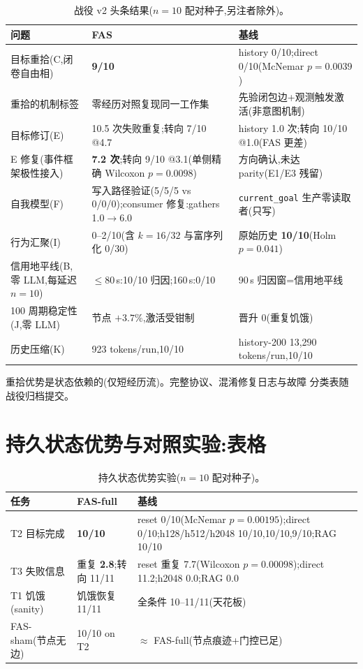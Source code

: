 \documentclass[10pt,a4paper]{ctexart}
\begin{document}
\begin{table}[h]
\centering\small
\caption{战役 v2 头条结果($n{=}10$ 配对种子,另注者除外)。}
\label{tab:s-campaign-zh}
\begin{tabular}{L{4.6cm}L{4.6cm}L{5.6cm}}
\toprule
\textbf{问题} & \textbf{FAS} & \textbf{基线} \\
\midrule
目标重拾(C,闭卷自由相) & \textbf{9/10} & history 0/10;direct 0/10(McNemar $p{=}0.0039$) \\
重拾的机制标签 & 零经历对照复现同一工作集 & 先验闭包边+观测触发激活(非意图机制) \\
目标修订(E) & 10.5 次失败重复;转向 7/10 @4.7 & history 1.0 次;转向 10/10 @1.0(FAS 更差) \\
E 修复(事件框架极性接入) & \textbf{7.2 次};转向 9/10 @3.1(单侧精确 Wilcoxon $p{=}0.0098$) & 方向确认,未达 parity(E1/E3 残留) \\
自我模型(F) & 写入路径验证(5/5/5 vs 0/0/0);consumer 修复:gathers 1.0$\rightarrow$6.0 & \texttt{current\_goal} 生产零读取者(只写) \\
行为汇聚(I) & 0--2/10(含 $k{=}16/32$ 与富序列化 0/30) & 原始历史 \textbf{10/10}(Holm $p{=}0.041$) \\
信用地平线(B,零 LLM,每延迟 $n{=}10$) & $\le$80\,s:10/10 归因;160\,s:0/10 & 90\,s 归因窗=信用地平线 \\
100 周期稳定性(J,零 LLM) & 节点 $+3.7\%$,激活受钳制 & 晋升 0(重复饥饿) \\
历史压缩(K) & 923 tokens/run,10/10 & history-200 13{,}290 tokens/run,10/10 \\
\bottomrule
\end{tabular}
\end{table}

重拾优势是状态依赖的(仅短经历流)。完整协议、混淆修复日志与故障
分类表随战役归档提交。


\section{持久状态优势与对照实验:表格}
\label{s16:psa}

\begin{table}[h]
\centering\small
\caption{持久状态优势实验($n{=}10$ 配对种子)。}
\label{tab:s-psa-zh}
\begin{tabular}{L{4.2cm}L{4.2cm}L{5.6cm}}
\toprule
\textbf{任务} & \textbf{FAS-full} & \textbf{基线} \\
\midrule
T2 目标完成 & \textbf{10/10} & reset 0/10(McNemar $p{=}0.00195$);direct 0/10;h128/h512/h2048 10/10,10/10,9/10;RAG 10/10 \\
T3 失败信息 & 重复 \textbf{2.8};转向 11/11 & reset 重复 7.7(Wilcoxon $p{=}0.00098$);direct 11.2;h2048 0.0;RAG 0.0 \\
T1 饥饿(sanity) & 饥饿恢复 11/11 & 全条件 10--11/11(天花板) \\
\midrule
FAS-sham(节点无边) & 10/10 on T2 & $\approx$ FAS-full(节点痕迹+门控已足) \\
\bottomrule
\end{tabular}
\end{table}
\end{document}
